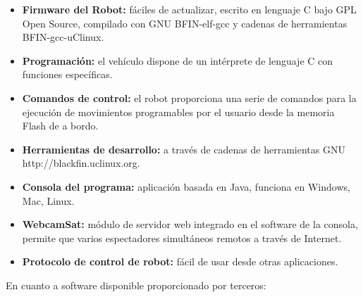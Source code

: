 \begin{itemize}

\item \textbf{Firmware del Robot:} fáciles de actualizar, escrito en lenguaje C bajo GPL Open Source, compilado con GNU BFIN-elf-gcc y cadenas de herramientas BFIN-gcc-uClinux. 

\item \textbf{Programación:} el vehículo dispone de un intérprete de lenguaje C con funciones específicas. 

\item \textbf {Comandos de control:} el robot proporciona una serie de comandos para la ejecución de movimientos programables por el usuario desde la memoria Flash de a bordo. 

\item \textbf{Herramientas de desarrollo:} a través de cadenas de herramientas GNU http://blackfin.uclinux.org. 

\item \textbf{Consola del programa:} aplicación basada en Java, funciona en Windows, Mac, Linux. 

\item \textbf {WebcamSat:} módulo de servidor web integrado en el software de la consola, permite que varios espectadores simultáneos remotos a través de Internet. 

\item \textbf{Protocolo de control de robot:} fácil de usar desde otras aplicaciones. 
\end{itemize}

En cuanto a software disponible proporcionado por terceros: 


